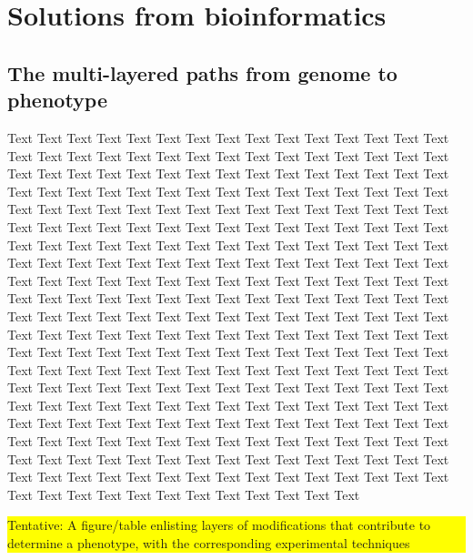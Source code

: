 \documentclass{bioinfo}
\newcommand{\todo}[1]{\colorbox{yellow}{\parbox{1\linewidth}{#1}}}
\begin{document}
\section{Solutions from bioinformatics}
\subsection{The multi-layered paths from genome to phenotype}

Text Text Text Text Text Text  Text Text Text Text Text Text Text Text  Text Text Text Text Text Text Text Text  Text Text Text Text Text Text Text Text  Text Text Text Text Text Text Text Text  Text Text Text Text Text Text Text Text  Text Text Text Text Text Text Text Text  Text Text Text Text Text Text Text Text  Text Text Text Text Text Text Text Text  Text Text Text Text Text Text Text Text  Text Text Text Text Text Text Text Text  Text Text Text Text Text Text Text Text  Text Text Text Text Text Text Text Text  Text Text Text Text Text Text Text Text  Text Text Text Text Text Text Text Text  Text Text Text Text Text Text Text Text  Text Text Text Text Text Text Text Text  Text Text Text Text Text Text Text Text  Text Text Text Text Text Text Text Text  Text Text Text Text Text Text Text Text  Text Text Text Text Text Text Text Text  Text Text Text Text Text Text Text Text  Text Text Text Text Text Text Text Text  Text Text Text Text Text Text Text Text  Text Text Text Text Text Text Text Text  Text Text Text Text Text Text Text Text  Text Text Text Text Text Text Text Text  Text Text Text Text Text Text Text Text  Text Text Text Text Text Text Text Text  Text Text Text Text Text Text Text Text  Text Text Text Text Text Text Text Text  Text Text Text Text Text Text Text Text  Text Text Text Text Text Text Text Text  Text Text Text Text Text Text Text Text  Text Text Text Text Text Text Text Text  Text Text Text Text Text Text Text Text  Text Text Text Text Text Text Text Text  Text Text Text Text Text Text Text Text  Text Text Text Text Text Text Text Text  Text Text 
%
\todo{Tentative: A figure/table enlisting layers of modifications that contribute to determine a phenotype, with the corresponding experimental techniques}
%
%
\end{document}
